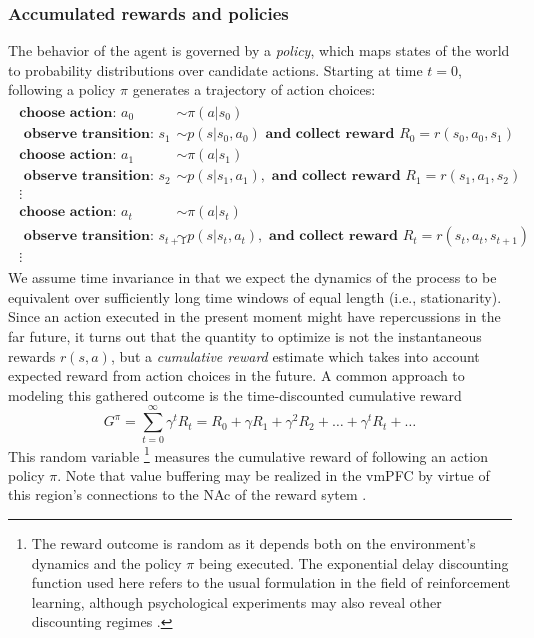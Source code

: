 \documentclass[10pt,letterpaper]{article}
\begin{document}
\subsubsection{Accumulated rewards and policies}
The behavior of the agent is governed by a \textit{policy}, which maps states of the world
to probability distributions over candidate actions.
Starting at time $t=0$,
following a policy $\pi$ generates a trajectory of action choices:
\begin{eqnarray*}
  \begin{split}
    \textbf{choose action: }a_0 &\sim \pi(a|s_0)\\
    \textbf{ observe transition: }s_1 &\sim p(s|s_0,a_0)\textbf{ and collect
      reward }R_0 = r(s_0, a_0, s_1)\\
    \textbf{choose action: }a_1 &\sim \pi(a|s_1)\\
    \textbf{ observe transition: }s_2 &\sim p(s|s_1,a_1), \textbf{ and collect
      reward }R_1 = r(s_1, a_1,s_2)\\
    \vdots\\
    \textbf{choose action: }a_{t} &\sim \pi(a|s_{t})\\
    \textbf{ observe transition: }s_{t+1} &\sim p(s|s_{t},a_{t}), \textbf{ and
      collect reward }R_{t} = r(s_{t}, a_{t},s_{t+1})\\
    \vdots
  \end{split}
\end{eqnarray*}
We assume time invariance
in that we expect the dynamics of the process
to be equivalent over sufficiently long time windows of equal length (i.e., stationarity).
Since an action executed in the present moment might have repercussions in the
far future, it turns out that the quantity to optimize is not the instantaneous
rewards $r(s, a)$, but a \textit{cumulative reward} estimate which takes into
account expected reward from action choices in the future. A common approach to
modeling this gathered outcome is the time-discounted cumulative reward%
\begin{equation}
  \label{eq:cumr}
  G^\pi = \sum_{t=0}^{\infty}\gamma^{t}R_t = R_0 + \gamma R_1 + \gamma^2 R_2 + \ldots + \gamma^tR_t + \ldots
\end{equation}
This random variable
  \footnote{The reward outcome is random as it depends both on the environment's dynamics and the
  policy $\pi$ being executed. The exponential delay discounting function used
  here refers to the usual formulation in the field of reinforcement learning,
  although psychological experiments may also reveal other discounting regimes
  \citep{green2004discounting}.}
measures the cumulative reward of
following an action policy $\pi$.
%
Note that value buffering may be realized in the vmPFC by virtue of
this region's connections to the NAc of the reward sytem
\citep{carlezon2009}.
\end{document}
